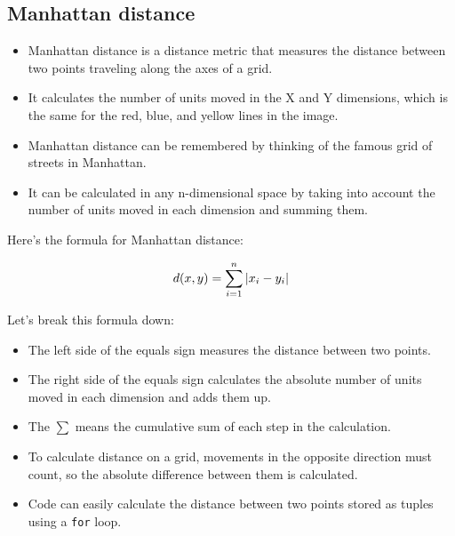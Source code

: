 \documentclass[11pt]{article}
\providecommand{\tightlist}{%
      \setlength{\itemsep}{0pt}\setlength{\parskip}{0pt}}
\begin{document}
\hypertarget{manhattan-distance}{%
\subsection{Manhattan distance}\label{manhattan-distance}}

\begin{itemize}
\tightlist
\item
  Manhattan distance is a distance metric that measures the distance
  between two points traveling along the axes of a grid.
\item
  It calculates the number of units moved in the X and Y dimensions,
  which is the same for the red, blue, and yellow lines in the image.
\item
  Manhattan distance can be remembered by thinking of the famous grid of
  streets in Manhattan.
\item
  It can be calculated in any n-dimensional space by taking into account
  the number of units moved in each dimension and summing them.
\end{itemize}

Here's the formula for Manhattan distance:

\[ \large d(x,y) = \sum_{i=1}^{n}|x_i - y_i | \]

Let's break this formula down:

\begin{itemize}
\tightlist
\item
  The left side of the equals sign measures the distance between two
  points.
\item
  The right side of the equals sign calculates the absolute number of
  units moved in each dimension and adds them up.
\item
  The \(\sum\) means the cumulative sum of each step in the calculation.
\item
  To calculate distance on a grid, movements in the opposite direction
  must count, so the absolute difference between them is calculated.
\item
  Code can easily calculate the distance between two points stored as
  tuples using a \texttt{for} loop.
\end{itemize}
\end{document}
